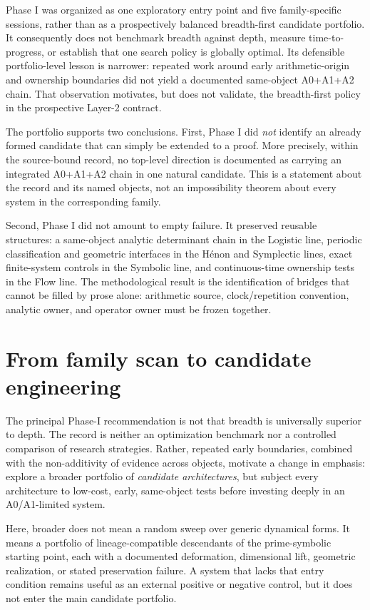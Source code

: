Phase I was organized as one exploratory entry point and five family-specific
sessions, rather than as a prospectively balanced breadth-first candidate
portfolio. It consequently does not benchmark breadth against depth, measure
time-to-progress, or establish that one search policy is globally optimal. Its
defensible portfolio-level lesson is narrower: repeated work around early
arithmetic-origin and ownership boundaries did not yield a documented
same-object A0+A1+A2 chain. That observation motivates, but does not validate,
the breadth-first policy in the prospective Layer-2 contract.

The portfolio supports two conclusions. First, Phase I did \emph{not} identify
an already formed candidate that can simply be extended to a proof. More
precisely, within the source-bound record, no top-level direction is documented
as carrying an integrated A0+A1+A2 chain in one natural candidate. This is a
statement about the record and its named objects, not an impossibility theorem
about every system in the corresponding family.

Second, Phase I did not amount to empty failure. It preserved reusable
structures: a same-object analytic determinant chain in the Logistic line,
periodic classification and geometric interfaces in the H\'{e}non and
Symplectic lines, exact finite-system controls in the Symbolic line, and
continuous-time ownership tests in the Flow line. The methodological result
is the identification of bridges that cannot be filled by prose alone:
arithmetic source, clock/repetition convention, analytic owner, and operator
owner must be frozen together.

\section{From family scan to candidate engineering}
\label{sec:strategy}

The principal Phase-I recommendation is not that breadth is universally
superior to depth. The record is neither an optimization benchmark nor a
controlled comparison of research strategies. Rather, repeated early
boundaries, combined with the non-additivity of evidence across objects,
motivate a change in emphasis: explore a broader portfolio of \emph{candidate
architectures}, but subject every architecture to low-cost, early,
same-object tests before investing deeply in an A0/A1-limited system.

Here, broader does not mean a random sweep over generic dynamical forms. It
means a portfolio of lineage-compatible descendants of the prime-symbolic
starting point, each with a documented deformation, dimensional lift, geometric
realization, or stated preservation failure. A system that lacks that entry
condition remains useful as an external positive or negative control, but it
does not enter the main candidate portfolio.

